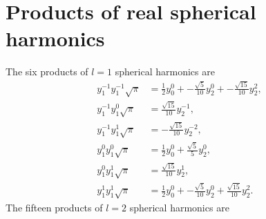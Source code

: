 \documentclass[11pt]{article}
\begin{document}
\section{Products of real spherical harmonics}\label{realspherical}
The six products of $l=1$ spherical harmonics are
\begin{align}
y_1^{-1}y_1^{-1}\sqrt{\pi} &= \frac{1}{2 }y_0^0 + - \frac{\sqrt{5}}{10 }y_2^0 + - \frac{\sqrt{15}}{10 }y_2^2,\\ 
y_1^{-1}y_1^0\sqrt{\pi} &= \frac{\sqrt{15}}{10 }y_2^{-1} ,\\
y_1^{-1}y_1^1\sqrt{\pi} &= - \frac{\sqrt{15}}{10 }y_2^{-2} ,\\
y_1^0y_1^0\sqrt{\pi} &= \frac{1}{2 }y_0^0 + \frac{\sqrt{5}}{5 }y_2^0 ,\\
y_1^0y_1^1\sqrt{\pi} &= \frac{\sqrt{15}}{10 }y_2^1 ,\\
y_1^1y_1^1\sqrt{\pi} &= \frac{1}{2 }y_0^0 + - \frac{\sqrt{5}}{10 }y_2^0 + \frac{\sqrt{15}}{10 }y_2^2.
\end{align}
The fifteen products of $l=2$ spherical harmonics are
\end{document}
